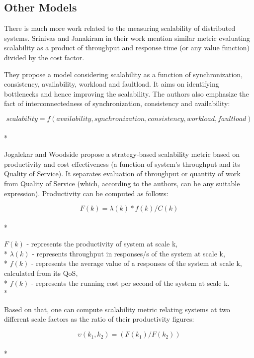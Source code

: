 \documentclass{uvamscse}
\begin{document}
\subsection{Other Models}
There is much more work related to the measuring scalability of distributed systems. Srinivas and Janakiram in their work \cite{SriJan} mention similar metric evaluating scalability as a product of throughput and response time (or any value function) divided by the cost factor.

They propose a model considering scalability as a function of synchronization, consistency, availability, workload and faultload. It aims on identifying bottlenecks and hence improving the scalability. The authors also emphasize the fact of interconnectedness of synchronization, consistency and availability:
\begin{center}
  $$scalability = f(availability, synchronization, consistency ,workload, faultload)$$ \\*
\end{center}

Jogalekar and Woodside \cite{EvaScaDS} propose a strategy-based scalability metric based on productivity and cost effectiveness (a function of system's throughput and its Quality of Service). It separates evaluation of throughput or quantity of work from Quality of Service (which, according to the authors, can be any suitable expression). Productivity can be computed as follows:
\begin{center}
  $$F(k) = \lambda(k) * f(k) / C(k)$$ \\*
\end{center}
  \texttt{$F(k)$} - represents the productivity of system at scale k, \\*
  \texttt{$\lambda(k)$} - represents throughput in responses/s of the system at scale k, \\*
  \texttt{$f(k)$} - represents the average value of a responses of the system at scale k, calculated from its QoS, \\*
  \texttt{$f(k)$} - represents the running cost per second of the system at scale k. \\*

Based on that, one can compute scalability metric relating systems at two different scale factors as the ratio of their productivity figures:
\begin{center}
  $$\upsilon(k_1,k_2) = (F(k_1)/F(k_2)) $$\\*
\end{center}
\end{document}

